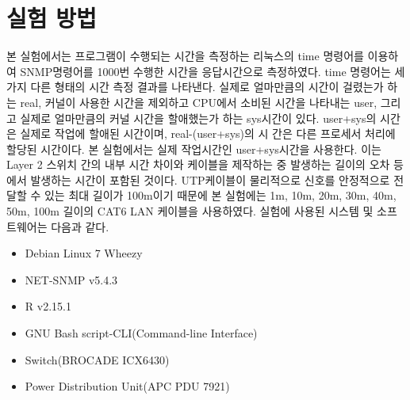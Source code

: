 \documentclass[11pt
  , a4paper
  , article
  , oneside
]{memoir}
\begin{document}
\section{실험 방법}
본 실험에서는 프로그램이 수행되는 시간을 측정하는 리눅스의 time 명령어를 이용하여 SNMP명령어를 1000번 수행한 시간을 응답시간으로 측정하였다. time 명령어는 세 가지 다른 형태의 시간 측정 결과를 나타낸다. 실제로 얼마만큼의 시간이 걸렸는가 하는 real, 커널이 사용한 시간을 제외하고 CPU에서 소비된 시간을 나타내는 user, 그리고 실제로 얼마만큼의 커널 시간을 할애했는가 하는 sys시간이 있다. user+sys의 시간은 실제로 작업에 할애된 시간이며, real-(user+sys)의 시
간은 다른 프로세서 처리에 할당된 시간이다\citep{time_command}. 
본 실험에서는 실제 작업시간인 user+sys시간을 사용한다. 이는 Layer 2 스위치 간의 내부 시간 차이와 케이블을 제작하는 중 발생하는 길이의 오차 등에서 발생하는 시간이 포함된 것이다. UTP케이블이 물리적으로 신호를 안정적으로 전달할 수 있는 최대 길이가 100m이기 때문에 본 실험에는 1m, 10m, 20m, 30m, 40m, 50m, 100m 길이의 CAT6 LAN 케이블을 사용하였다.
실험에 사용된 시스템 및 소프트웨어는 다음과 같다.

\begin{itemize}
\item Debian Linux 7 Wheezy
\item NET-SNMP v5.4.3
\item R v2.15.1
\item GNU Bash script-CLI(Command-line Interface) 
\item Switch(BROCADE ICX6430)
\item Power Distribution Unit(APC PDU 7921)
\end{itemize}
\end{document}
